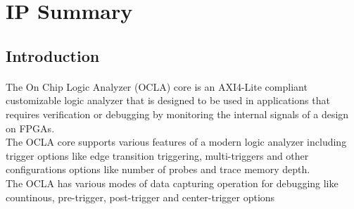 \documentclass[phv, 11pt ]{SelfArx} %
\begin{document}
{\newpage

\section*{\hfill \fontsize{24}{28}\selectfont IP Summary}

	\subsection*{\fontsize{14}{16}\selectfont Introduction}
	\paragraph{}
	 The On Chip Logic Analyzer (OCLA)
	core is an AXI4-Lite compliant customizable logic analyzer that is designed to be used in applications that requires verification or debugging by monitoring the internal signals of a design on FPGAs.\\ The OCLA core supports various features of a modern logic analyzer including trigger options like edge transition triggering, multi-triggers and other configurations options like number of probes and trace memory depth.
	\\  The OCLA has various modes of data capturing operation for debugging like countinous, pre-trigger, post-trigger and center-trigger options
	\noindent

}
\end{document}
